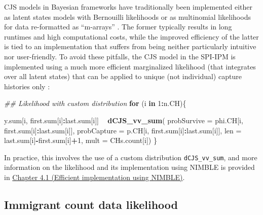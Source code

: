 \documentclass[
]{book}
\newenvironment{Shaded}{\begin{snugshade}}{\end{snugshade}}
\newcommand{\CommentTok}[1]{\textcolor[rgb]{0.56,0.35,0.01}{\textit{#1}}}
\newcommand{\ControlFlowTok}[1]{\textcolor[rgb]{0.13,0.29,0.53}{\textbf{#1}}}
\newcommand{\DataTypeTok}[1]{\textcolor[rgb]{0.13,0.29,0.53}{#1}}
\newcommand{\DecValTok}[1]{\textcolor[rgb]{0.00,0.00,0.81}{#1}}
\newcommand{\KeywordTok}[1]{\textcolor[rgb]{0.13,0.29,0.53}{\textbf{#1}}}
\newcommand{\NormalTok}[1]{#1}
\newcommand{\OperatorTok}[1]{\textcolor[rgb]{0.81,0.36,0.00}{\textbf{#1}}}
\newcommand{\StringTok}[1]{\textcolor[rgb]{0.31,0.60,0.02}{#1}}
\begin{document}
CJS models in Bayesian frameworks have traditionally been implemented either as latent states models with Bernouilli likelihoods or as multinomial likelihoods for data re-formatted as ``m-arrays'' \citep{gimenez2007, kery2011}. The former typically results in long runtimes and high computational costs, while the improved efficiency of the latter is tied to an implementation that suffers from being neither particularly intuitive nor user-friendly. To avoid these pitfalls, the CJS model in the SPI-IPM is implemented using a much more efficient marginalized likelihood (that integrates over all latent states) that can be applied to unique (not individual) capture histories only \citep[following][]{turek2016}:

\begin{Shaded}
\begin{Highlighting}[]
\CommentTok{## Likelihood with custom distribution}
\ControlFlowTok{for}\NormalTok{ (i }\ControlFlowTok{in} \DecValTok{1}\OperatorTok{:}\NormalTok{n.CH)\{}

\NormalTok{  y.sum[i, first.sum[i]}\OperatorTok{:}\NormalTok{last.sum[i]] }\OperatorTok{~}\StringTok{ }\KeywordTok{dCJS_vv_sum}\NormalTok{(}
      \DataTypeTok{probSurvive =}\NormalTok{ phi.CH[i, first.sum[i]}\OperatorTok{:}\NormalTok{last.sum[i]],}
      \DataTypeTok{probCapture =}\NormalTok{ p.CH[i, first.sum[i]}\OperatorTok{:}\NormalTok{last.sum[i]],}
      \DataTypeTok{len =}\NormalTok{ last.sum[i]}\OperatorTok{-}\NormalTok{first.sum[i]}\OperatorTok{+}\DecValTok{1}\NormalTok{,}
      \DataTypeTok{mult =}\NormalTok{ CHs.count[i])}
\NormalTok{    \}}
\end{Highlighting}
\end{Shaded}

In practice, this involves the use of a custom distribution \texttt{dCJS\_vv\_sum}, and more information on the likelihood and its implementation using NIMBLE is provided in \protect\hyperlink{ux5cux23ux5cux2520Efficientux5cux2520implementationux5cux2520usingux5cux2520NIMBLE}{Chapter 4.1 (Efficient implementation using NIMBLE)}.

\hypertarget{immigrant-count-data-likelihood}{%
\subsection{Immigrant count data likelihood}\label{immigrant-count-data-likelihood}}
\end{document}
